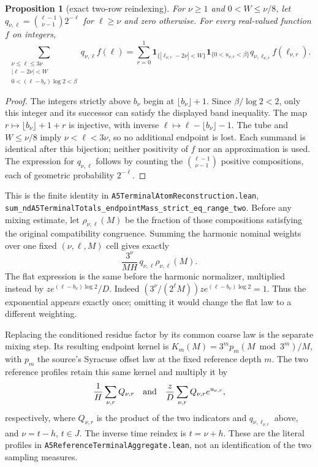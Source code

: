 \documentclass[11pt]{article}
\newtheorem{proposition}{Proposition}
\theoremstyle{remark}\newtheorem{remark}[proposition]{Remark}
\begin{document}
\begin{proposition}[exact two-row reindexing]
\label{prop:mazur-two-rows}
For $\nu\ge1$ and $0<W\le\nu/8$, let
$q_{\nu,\ell}=\binom{\ell-1}{\nu-1}2^{-\ell}$ for $\ell\ge\nu$
and zero otherwise. For every real-valued function $f$ on integers,
\[
 \sum_{\substack{\nu\le\ell\le3\nu\\|\ell-2\nu|<W\\
              0<(\ell-b_\nu)\log2<\beta}}
      q_{\nu,\ell}f(\ell)
 =
 \sum_{r=0}^1
 \mathbf1_{\{|\ell_{\nu,r}-2\nu|<W\}}
 \mathbf1_{\{0<u_{\nu,r}<\beta\}}
 q_{\nu,\ell_{\nu,r}}f(\ell_{\nu,r}).
\]
\end{proposition}
\begin{proof}
The integers strictly above $b_\nu$ begin at
$\lfloor b_\nu\rfloor+1$. Since $\beta/\log2<2$, only this
integer and its successor can satisfy the displayed band inequality.
The map $r\mapsto\lfloor b_\nu\rfloor+1+r$ is injective, with
inverse $\ell\mapsto\ell-\lfloor b_\nu\rfloor-1$.
The tube and $W\le\nu/8$ imply $\nu<\ell<3\nu$, so no
additional endpoint is lost. Each summand is identical after this
bijection; neither positivity of $f$ nor an approximation is used.
The expression for $q_{\nu,\ell}$ follows by counting the
$\binom{\ell-1}{\nu-1}$ positive compositions, each of geometric
probability $2^{-\ell}$.
\end{proof}

This is the finite identity in
\texttt{A5TerminalAtomReconstruction.lean},
\texttt{sum\_ndA5TerminalTotals\_endpointMass\_strict\_eq\_range\_two}.
Before any mixing estimate, let $\rho_{\nu,\ell}(M)$ be the fraction
of those compositions satisfying the original compatibility congruence.
Summing the harmonic nominal weights over one fixed $(\nu,\ell,M)$
cell gives exactly
\[
 \frac{3^\nu}{MH}\,q_{\nu,\ell}\rho_{\nu,\ell}(M).
\]
The flat expression is the same before the harmonic normalizer,
multiplied instead by $z e^{(\ell-b_\nu)\log2}/D$.
Indeed $(3^\nu/(2^\ell M))ze^{(\ell-b_\nu)\log2}=1$.
Thus the exponential appears exactly once; omitting it would change
the flat law to a different weighting.

Replacing the conditioned residue factor by its common coarse law
is the separate mixing step. Its resulting endpoint kernel is
$K_m(M)=3^m p_m(M\bmod3^m)/M$, with $p_m$ the source's
Syracuse offset law at the fixed reference depth $m$.
The two reference profiles retain this same kernel and multiply it by
\[
 \frac1H\sum_{\nu,r}Q_{\nu,r}
 \quad\hbox{and}\quad
 \frac zD\sum_{\nu,r}Q_{\nu,r}e^{u_{\nu,r}},
\]
respectively, where $Q_{\nu,r}$ is the product of the two indicators
and $q_{\nu,\ell_{\nu,r}}$ above, and $\nu=t-h$, $t\in J$.
The inverse time reindex is $t=\nu+h$. These are the literal
profiles in \texttt{A5ReferenceTerminalAggregate.lean}, not an
identification of the two sampling measures.
\end{document}
